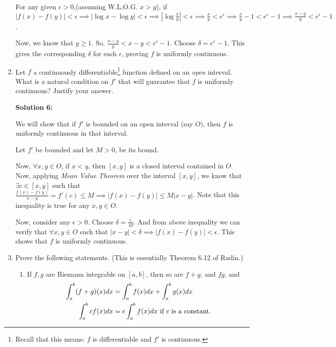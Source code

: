 \documentclass[11pt]{amsart}
\theoremstyle{definition}
\begin{document}
\begin{enumerate}[wide, labelwidth=!, labelindent=0pt]
For any given $\epsilon >0$,(assuming W.L.O.G. $x > y$), if $|f(x)-f(y)|<\epsilon \implies |\log x - \log y|<\epsilon \implies |\log \frac{x}{y}| < \epsilon \implies \frac{x}{y} < e^{\epsilon} \implies \frac{x}{y} - 1 < e^{\epsilon} -1 \implies \frac{x-y}{y} < e^{\epsilon} -1$.

Now, we know that $y \ge 1$. So, $\frac{x-y}{y} < x-y < e^{\epsilon} -1$. Choose $\delta = e^{\epsilon} -1$. This gives the corresponding $\delta$ for each $\epsilon$, proving $f$ is uniformly continuous.

\item  Let $f$ a continuously differentiable\footnote{Recall that this means: $f$ is differentiable and $f'$ is continuous.} function defined on an \emph{open} interval.  What is a natural condition on $f'$ that will guarantee that $f$ is uniformly continuous? Justify your answer. 

\textbf{Solution 6:}

We will show that if $f'$ is bounded on an open interval (say $O$), then $f$ is uniformly continuous in that interval.

Let $f'$ be bounded and let $M>0$, be its bound.

Now, $\forall x,y \in O$, if $x<y$, then $[x,y]$ is a closed interval contained in $O$. Now, applying \textit{Mean Value Theorem} over the interval $[x,y]$, we know that $\exists c \in [x,y]$ such that $\frac{f(x)-f(y)}{x-y} = f'(c) \le M \implies |f(x)-f(y)| \le M|x-y|$. Note that this inequality is true for any $x,y \in O$.

Now, consider any $\epsilon>0$. Choose $\delta = \frac{\epsilon}{M}$. And from above inequality we can verify that $\forall x,y \in O$ such that $|x-y| < \delta \implies |f(x) - f(y)| < \epsilon$. This shows that $f$ is uniformly continuous.

\item Prove the following statements. (This is essentially Theorem 6.12 of Rudin.)

\begin{enumerate}[label=(\alph*)]
\item If $f,g$ are Riemann integrable on $[a,b]$, then so are $f+g$, and $fg$, and
\begin{equation*}
\begin{split}
\int_a^b (f+g)(x) dx&= \int_a^b f(x) dx +\int_a^b g(x) dx\\
\int_a^b cf(x) dx &= c\int_a^b f(x) dx\ \textup{if $c$ is a constant.}
\end{split}
\end{equation*}


\end{enumerate}
\end{enumerate}
\end{document}
